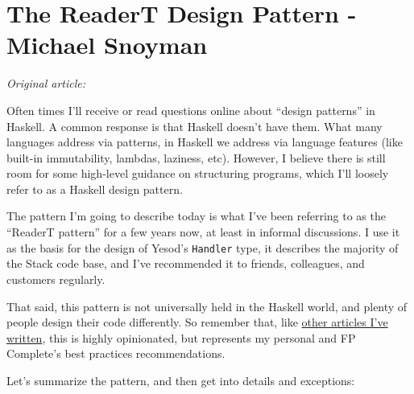 \chapter{The ReaderT Design Pattern - Michael Snoyman}

\noindent\textit{Original article: \cite{readert_pattern}}

\vspace{\baselineskip}

\noindent Often times I'll receive or read questions online about ``design
patterns'' in Haskell. A common response is that Haskell doesn't have
them. What many languages address via patterns, in Haskell we address
via language features (like built-in immutability, lambdas, laziness,
etc). However, I believe there is still room for some high-level
guidance on structuring programs, which I'll loosely refer to as a
Haskell design pattern.

The pattern I'm going to describe today is what I've been referring to
as the ``ReaderT pattern'' for a few years now, at least in informal
discussions. I use it as the basis for the design of Yesod's
\texttt{Handler} type, it describes the majority of the Stack code base,
and I've recommended it to friends, colleagues, and customers regularly.

That said, this pattern is not universally held in the Haskell world,
and plenty of people design their code differently. So remember that,
like
\href{https://www.fpcomplete.com/blog/2016/11/exceptions-best-practices-haskell}{other
articles I've written}, this is highly opinionated, but represents my
personal and FP Complete's best practices recommendations.

Let's summarize the pattern, and then get into details and exceptions:

